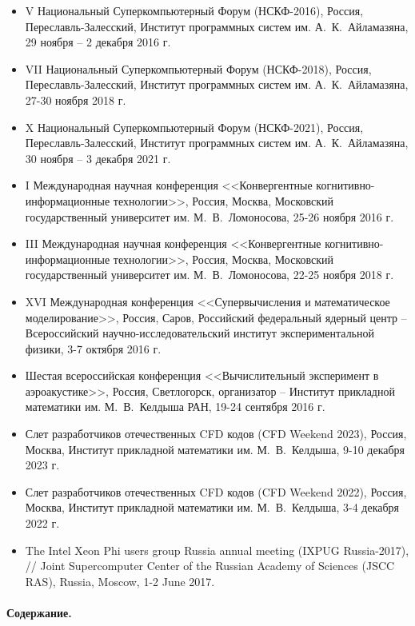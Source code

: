 \documentclass[a4paper,14pt]{extarticle}                     %
\numberwithin{equation}{section}                             %
\numberwithin{figure}{section}                               %
\numberwithin{table}{section}                                %
\theoremstyle{plain}                                         %
\numberwithin{theorem}{section}                              %
\numberwithin{lemma}{section}                                %
\numberwithin{definition}{section}                           %
\begin{document}
\begin{itemize}
\item V Национальный Суперкомпьютерный Форум (НСКФ-2016), Россия, Переславль-Залесский, Институт программных систем им. А.~К.~Айламазяна, 29 ноября -- 2 декабря 2016 г.
\item VII Национальный Суперкомпьютерный Форум (НСКФ-2018), Россия, Переславль-Залесский, Институт программных систем им. А.~К.~Айламазяна, 27-30 ноября 2018 г.
\item X Национальный Суперкомпьютерный Форум (НСКФ-2021), Россия, Переславль-Залесский, Институт программных систем им. А.~К.~Айламазяна, 30 ноября -- 3 декабря 2021 г.
\item I Международная научная конференция <<Конвергентные когнитивно-информационные технологии>>, Россия, Москва, Московский государственный университет им. М.~В.~Ломоносова, 25-26 ноября 2016 г.
\item III Международная научная конференция <<Конвергентные когнитивно-информационные технологии>>, Россия, Москва, Московский государственный университет им. М.~В.~Ломоносова, 22-25 ноября 2018 г.
\item XVI Международная конференция <<Супервычисления и математическое моделирование>>, Россия, Саров, Российский федеральный ядерный центр -- Всероссийский научно-исследовательский институт экспериментальной физики, 3-7 октября 2016 г.
\item Шестая всероссийская конференция <<Вычислительный эксперимент в аэроакустике>>, Россия, Светлогорск, организатор -- Институт прикладной математики им. М.~В.~Келдыша РАН, 19-24 сентября 2016 г.
\item Слет разработчиков отечественных CFD кодов (CFD Weekend 2023), Россия, Москва, Институт прикладной математики им. М.~В.~Келдыша, 9-10 декабря 2023 г.
\item Слет разработчиков отечественных CFD кодов (CFD Weekend 2022), Россия, Москва, Институт прикладной математики им. М.~В.~Келдыша, 3-4 декабря 2022 г.
\item The Intel Xeon Phi users group Russia annual meeting (IXPUG Russia-2017), // Joint Supercomputer Center of the Russian Academy of Sciences (JSCC RAS), Russia, Moscow, 1-2 June 2017.
\end{itemize}

\paragraph{Содержание.}
\end{document}
